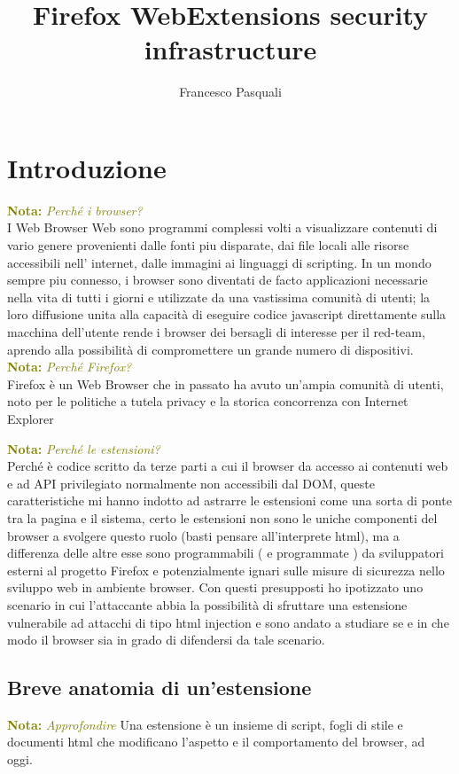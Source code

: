 \documentclass[]{./sapthesis/sapthesis}
\title{Firefox WebExtensions security infrastructure}
\author{Francesco Pasquali}
\newcommand{\MComment}[3]{\textcolor{#3}{ \textbf{#1} \textit{#2}}}
\newcommand{\Nota}[1]{\MComment{Nota:}{#1}{olive}}
\begin{document}
\maketitle
\tableofcontents
\newpage



\mainmatter
\chapter{Introduzione}
    \Nota{Perché i browser?}\\
    I Web Browser Web sono programmi complessi volti a visualizzare contenuti di vario genere
    provenienti dalle fonti piu disparate, dai file locali alle risorse accessibili nell'
    internet, dalle immagini ai linguaggi di scripting. In un mondo sempre piu connesso, i
    browser sono diventati de facto applicazioni necessarie nella vita di tutti i giorni e
    utilizzate da una vastissima comunità di utenti; la loro diffusione unita alla capacità
    di eseguire codice javascript direttamente sulla macchina dell'utente rende i browser
    dei bersagli di interesse per il red-team, aprendo alla possibilità di compromettere un
    grande numero di dispositivi.\\

    \Nota{Perché Firefox?}\\
    Firefox è un Web Browser che in passato ha avuto un'ampia comunità di utenti, noto per
    le politiche a tutela privacy e la storica concorrenza con Internet Explorer


    \Nota{Perché le estensioni?}\\
    Perché è codice scritto da terze parti a cui il browser da accesso ai contenuti web e
    ad API privilegiato normalmente non accessibili dal DOM, queste caratteristiche mi hanno
    indotto ad astrarre le estensioni come una sorta di ponte tra la pagina e il sistema,
    certo le estensioni non sono le uniche componenti del browser a svolgere questo ruolo
    (basti pensare all'interprete html), ma a differenza delle altre esse sono programmabili
    ( e programmate ) da sviluppatori esterni al progetto Firefox e potenzialmente
    ignari sulle misure di sicurezza nello sviluppo web in ambiente browser. 
    Con questi presupposti ho ipotizzato uno scenario in cui l'attaccante abbia la
    possibilità di sfruttare una estensione vulnerabile ad attacchi di tipo html injection
    e sono andato a studiare se e in che modo il browser sia in grado di difendersi
    da tale scenario.

    \section{Breve anatomia di un'estensione}
        \Nota{Approfondire}
        Una estensione è un insieme di script, fogli di stile e documenti html che modificano
        l'aspetto e il comportamento del browser, ad oggi.
\end{document}

